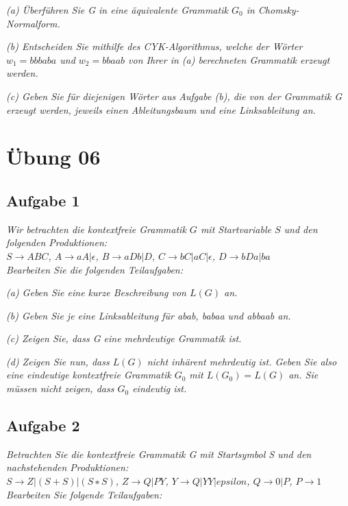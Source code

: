 \documentclass[a4paper]{article}
\begin{document}
\textit{(a) Überführen Sie G in eine äquivalente Grammatik $G_0$ in Chomsky-Normalform.}

\textit{(b) Entscheiden Sie mithilfe des CYK-Algorithmus, welche der Wörter $w_1 = bbbaba$ und $w_2 = bbaab$ von Ihrer in (a) berechneten Grammatik erzeugt werden.}

\textit{(c) Geben Sie für diejenigen Wörter aus Aufgabe (b), die von der Grammatik G erzeugt werden, jeweils einen Ableitungsbaum und eine Linksableitung an.}



\newpage
\section{Übung 06}
\subsection{Aufgabe 1}
\textit{Wir betrachten die kontextfreie Grammatik $G$ mit Startvariable $S$ und den folgenden Produktionen:\\
$S\rightarrow ABC$, $A\rightarrow aA |\epsilon$, $B\rightarrow aDb | D$, $C \rightarrow bC | aC | \epsilon$, $D \rightarrow bDa | ba$\\
Bearbeiten Sie die folgenden Teilaufgaben:}

\textit{(a) Geben Sie eine kurze Beschreibung von $L(G)$ an.}

\textit{(b) Geben Sie je eine Linksableitung für abab, babaa und abbaab an.}

\textit{(c) Zeigen Sie, dass G eine mehrdeutige Grammatik ist.}

\textit{(d) Zeigen Sie nun, dass $L(G)$ nicht inhärent mehrdeutig ist. Geben Sie also eine eindeutige kontextfreie Grammatik $G_0$ mit $L(G_0) = L(G)$ an. Sie müssen nicht zeigen, dass $G_0$ eindeutig ist.}

\subsection{Aufgabe 2}
\textit{Betrachten Sie die kontextfreie Grammatik G mit Startsymbol S und den nachstehenden Produktionen:\\
$S\rightarrow Z | (S + S) | (S ∗ S)$, $Z\rightarrow Q | PY$, $Y\rightarrow Q | YY | epsilon$, 
$Q\rightarrow 0 | P$, $P\rightarrow 1$\\
Bearbeiten Sie folgende Teilaufgaben:}
\end{document}
